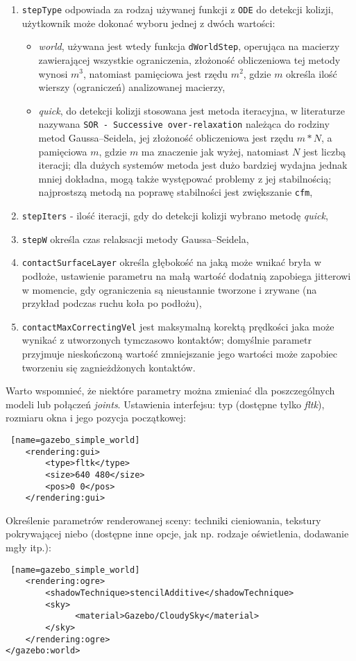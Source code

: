 \begin {enumerate}
	 \item \texttt{stepType} odpowiada za rodzaj używanej funkcji z \texttt{ODE} do detekcji kolizji, użytkownik może dokonać wyboru jednej z dwóch wartości:
	      \begin{itemize}
	       \item \textit{world}, używana jest wtedy funkcja \texttt{dWorldStep}, operująca na macierzy zawierającej wszystkie ograniczenia, złożoność obliczeniowa tej metody wynosi $m^3$, natomiast pamięciowa
jest rzędu $m^2$, gdzie $m$ określa ilość wierszy (ograniczeń) analizowanej macierzy,
	       \item \textit{quick}, do detekcji kolizji stosowana jest metoda iteracyjna, w literaturze nazywana \texttt{SOR - Successive over-relaxation} należąca do rodziny metod Gaussa–Seidela, jej złożoność obliczeniowa jest rzędu $m*N$,
		a pamięciowa $m$, gdzie $m$ ma znaczenie jak wyżej,
		natomiast $N$ jest liczbą iteracji; dla dużych systemów metoda jest dużo bardziej wydajna jednak mniej dokładna, mogą także występować problemy z jej stabilnością; najprostszą metodą na poprawę stabilności
		jest zwiększanie \texttt{cfm}, 
	      \end{itemize}
	 \item \texttt{stepIters} - ilość iteracji, gdy do detekcji kolizji wybrano metodę \textit{quick},
	 \item \texttt{stepW} określa czas relaksacji metody Gaussa–Seidela, 
	 \item \texttt{contactSurfaceLayer} określa głębokość na jaką może wnikać bryła w podłoże, ustawienie parametru na małą wartość dodatnią zapobiega jitterowi w momencie, gdy ograniczenia są nieustannie tworzone
	  i zrywane (na przykład podczas ruchu koła po podłożu),
	 \item \texttt{contactMaxCorrectingVel} jest maksymalną korektą prędkości jaka może wynikać z utworzonych tymczasowo kontaktów; domyślnie parametr przyjmuje nieskończoną wartość zmniejszanie jego
	   wartości może zapobiec tworzeniu się zagnieżdżonych kontaktów. 
	\end {enumerate}
	Warto wspomnieć, że niektóre parametry można zmieniać dla poszczególnych modeli lub połączeń \textit{joints}.\newline
	Ustawienia interfejsu: typ (dostępne tylko \textit{fltk}), rozmiaru okna i jego pozycja początkowej:
\begin{lstlisting} [name=gazebo_simple_world]
    <rendering:gui>
        <type>fltk</type>
        <size>640 480</size>
        <pos>0 0</pos>
    </rendering:gui>
\end{lstlisting}
	Określenie parametrów renderowanej sceny: techniki cieniowania, tekstury pokrywającej niebo (dostępne inne opcje, jak np. rodzaje oświetlenia, dodawanie mgły itp.):
\begin{lstlisting} [name=gazebo_simple_world]
    <rendering:ogre>
        <shadowTechnique>stencilAdditive</shadowTechnique>
        <sky>
              <material>Gazebo/CloudySky</material>
        </sky>
    </rendering:ogre>
</gazebo:world>
\end{lstlisting}

